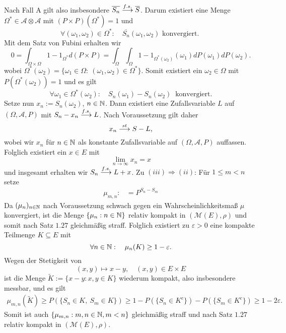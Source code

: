 \begin{proof*}
$$    $$
    Nach Fall A gilt also insbesondere $\overline{S_n} \overset{f.s.}{\longrightarrow}  \overline{S}$. Darum existiert eine Menge $\Omega^* \in \mathcal{A}\otimes\mathcal{A}$ mit \mbox{$(P\times P)(\Omega^*) = 1$} und
    $$  
        \forall (\omega_1, \omega_2) \in \Omega^*: \quad \overline{S_n}(\omega_1, \omega_2) \text{ konvergiert. }
    $$
    Mit dem Satz von Fubini erhalten wir
    $$
        0 = \int_{\Omega \times \Omega}1 - 1_{\Omega^*} d(P \times P) = \int_{\Omega}\int_{\Omega}1 - 1_{\Omega^*(\omega_2)}(\omega_1)dP(\omega_1)dP(\omega_2). 
    $$
    wobei $\Omega^*(\omega_2) =\{\omega_1\in\Omega: \ (\omega_1, \omega_2) \in \Omega^* \}$. Somit existiert ein $\omega_2 \in \Omega$ mit $P(\Omega^*(\omega_2)) = 1$ und es gilt
    $$
        \forall \omega_1 \in \Omega^*(\omega_2): \quad S_n(\omega_1) - S_n(\omega_2) \ \text{ konvergiert.}
    $$
    Setze nun $x_n := S_n(\omega_2)$, $n \in \mathbb{N}$. Dann existiert eine Zufallsvariable $L$ auf $(\Omega, \mathcal{A}, P)$ mit $S_n - x_n \overset{f.s.}{\longrightarrow} L$. Nach Voraussetzung gilt daher 
    $$
        x_n \overset{st}{\longrightarrow} S - L,
    $$
    wobei wir $x_n$ für $n \in \mathbb{N}$ als konstante Zufallsvariable auf $(\Omega, \mathcal{A}, P)$ auffassen. Folglich existiert ein $x \in E$ mit 
    $$
        \lim_{n \to \infty}x_n = x
    $$
    und insgesamt erhalten wir $S_n \overset{f.s.}{\longrightarrow} L + x$. 
    \newline 
    Zu $(iii) \Rightarrow (ii)$: Für $1 \leq m < n$ setze
    \begin{align*}
        \mu_{m,n} :&= P^{S_n - S_m}
    \end{align*}
    Da $(\mu_n)_{n \in \mathbb{N}}$ nach Voraussetzung schwach gegen ein Wahrscheinlichkeitsmaß $\mu$ konvergiert,
    ist die Menge $\{\mu_n: n \in \mathbb{N} \}$ relativ kompakt in $(\mathcal{M}(E), \rho)$ und somit nach Satz $1.27$ gleichmäßig straff.
    Folglich existiert zu $\varepsilon > 0$ eine kompakte Teilmenge $K \subseteq E$ mit 
    $$
        \forall n \in \mathbb{N}: \quad \mu_n(K) \geq 1 - \varepsilon. 
    $$
    Wegen der Stetigkeit von 
    $$
        (x,y) \mapsto x - y, \quad (x,y) \in E \times E
    $$
    ist die Menge $\tilde{K} := \{x - y : x,y \in K \}$ wiederum kompakt, also insbesondere messbar, und es gilt
    \begin{align*}
        \mu_{m,n}(\tilde{K}) \geq P(\{S_n \in K, \ S_m \in K\}) \geq 1 - P(\{S_n \in K^c\}) - P(\{S_m \in K^c\}) \geq 1 - 2\varepsilon.
    \end{align*}
    Somit ist auch $\{\mu_{m,n}: m,n \in \mathbb{N}, m < n \}$ gleichmäßig straff und nach Satz $1.27$ relativ kompakt in $(\mathcal{M}(E), \rho)$. 

\end{proof*}
